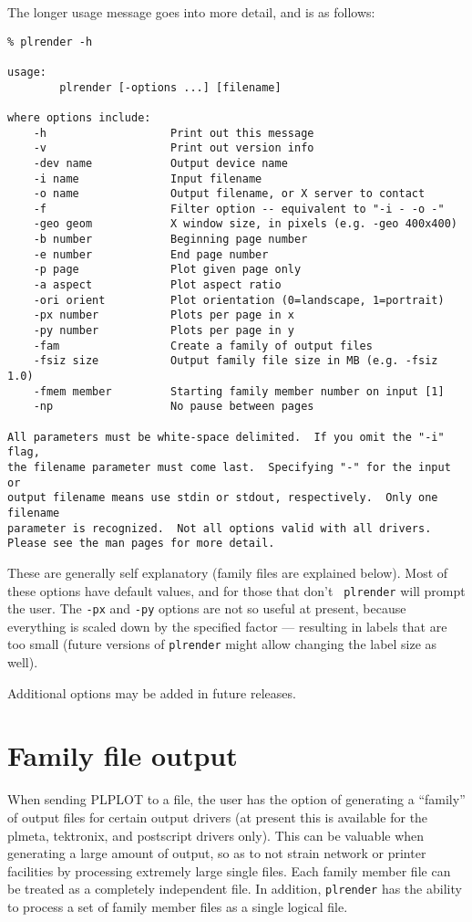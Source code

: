 The longer usage message goes into more detail, and is as follows:
\begin{verbatim}
% plrender -h

usage:
        plrender [-options ...] [filename]

where options include:
    -h                   Print out this message
    -v                   Print out version info
    -dev name            Output device name
    -i name              Input filename
    -o name              Output filename, or X server to contact
    -f                   Filter option -- equivalent to "-i - -o -"
    -geo geom            X window size, in pixels (e.g. -geo 400x400)
    -b number            Beginning page number
    -e number            End page number
    -p page              Plot given page only
    -a aspect            Plot aspect ratio
    -ori orient          Plot orientation (0=landscape, 1=portrait)
    -px number           Plots per page in x
    -py number           Plots per page in y
    -fam                 Create a family of output files
    -fsiz size           Output family file size in MB (e.g. -fsiz 1.0)
    -fmem member         Starting family member number on input [1]
    -np                  No pause between pages

All parameters must be white-space delimited.  If you omit the "-i" flag,
the filename parameter must come last.  Specifying "-" for the input or
output filename means use stdin or stdout, respectively.  Only one filename
parameter is recognized.  Not all options valid with all drivers.
Please see the man pages for more detail.
\end{verbatim}
These are generally self explanatory (family files are explained below).
Most of these options have default values, and for those that don't {\tt
plrender} will prompt the user.  The {\tt -px} and {\tt -py} options are
not so useful at present, because everything is scaled down by the
specified factor --- resulting in labels that are too small (future
versions of {\tt plrender} might allow changing the label size as well). 

Additional options may be added in future releases.

\section{Family file output}\label{sec:family}

When sending PLPLOT to a file, the user has the option of generating a
``family'' of output files for certain output drivers (at present this
is available for the plmeta, tektronix, and postscript drivers only).
This can be valuable when generating a large amount of output, so as to not
strain network or printer facilities by processing extremely large single
files.  Each family member file can be treated as a completely independent
file.  In addition, {\tt plrender} has the ability to process a set of
family member files as a single logical file.

